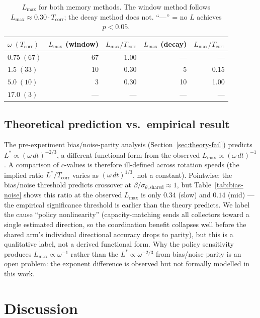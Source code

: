 \documentclass[sigconf,anonymous]{aamas}
\newcommand{\Lmax}{L_{\max}}
\newcommand{\Tcorr}{T_{\mathrm{corr}}}
\newcommand{\angbias}{\beta}
\begin{document}
\begin{table}[t]
\centering
\caption{$\Lmax$ for both memory methods. The window method
follows $\Lmax \approx 0.30 \cdot \Tcorr$; the decay method does
not. ``---'' = no $L$ achieves $p{<}0.05$.}
\label{tab:decay-lmax}
\setlength\tabcolsep{5pt}
\begin{tabular}{lrrrr}
\toprule
$\omega\;(\Tcorr)$
  & $\Lmax$ (window) & $\Lmax/\Tcorr$
  & $\Lmax$ (decay)  & $\Lmax/\Tcorr$ \\
\midrule
$0.75\;(67)$ & 67  & 1.00 & ---  & --- \\
$1.5\;(33)$  & 10  & 0.30 &  5   & 0.15 \\
$5.0\;(10)$  &  3  & 0.30 & 10   & 1.00 \\
$17.0\;(3)$  & --- & ---  & ---  & --- \\
\bottomrule
\end{tabular}
\end{table}

\subsection{Theoretical prediction vs.\ empirical result}

The pre-experiment bias/noise-parity analysis
(Section~\ref{sec:theory-fail}) predicts $L^* \propto (\omega\,dt)^{-2/3}$,
a different functional form from the observed
$\Lmax \propto (\omega\,dt)^{-1}$.  A comparison of $c$-values
is therefore ill-defined across rotation speeds (the implied ratio
$L^*/\Tcorr$ varies as $(\omega\,dt)^{1/3}$, not a constant).
Pointwise: the bias/noise threshold
predicts crossover at $\angbias/\sigma_{\theta,\mathrm{shared}} \approx 1$,
but Table~\ref{tab:bias-noise} shows this ratio at the observed
$\Lmax$ is only $0.34$ (slow) and $0.14$ (mid) — the empirical
significance threshold is earlier than the theory predicts.
We label the cause ``policy nonlinearity'' (capacity-matching sends all
collectors toward a single estimated direction, so the coordination
benefit collapses well before the shared arm's individual directional
accuracy drops to parity), but this is a qualitative label, not a
derived functional form.  Why the policy sensitivity produces
$\Lmax \propto \omega^{-1}$ rather than the $L^* \propto \omega^{-2/3}$
from bias/noise parity is an open problem: the exponent difference is
observed but not formally modelled in this work.

\section{Discussion}
\label{sec:discussion}
\end{document}
